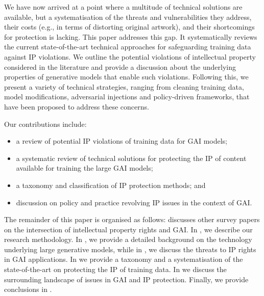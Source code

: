 \documentclass[conference,table]{IEEEtran}
\begin{document}
We have now arrived at a point where a multitude of technical solutions are available, but a systematisation of the threats and vulnerabilities they address, their costs (e.g., in terms of distorting original artwork), and their shortcomings for protection is lacking.
This paper addresses this gap. It systematically reviews the current state-of-the-art technical approaches for safeguarding training data against IP violations. 
We outline the potential violations of intellectual property considered in the literature and provide a discussion about the underlying properties of generative models that enable such violations. 
Following this, we present a variety of technical strategies, ranging from cleaning training data, model modifications, adversarial injections and policy-driven frameworks, that have been proposed to address these concerns. 

Our contributions include:
\begin{itemize}
    \item a review of potential IP violations of training data for GAI models;
    \item a systematic review of technical solutions for protecting the IP of content available for training the large GAI models; 
    \item a taxonomy and classification of IP protection methods; and
    \item discussion on policy and practice revolving IP issues in the context of GAI.
\end{itemize}

The remainder of this paper is organised as follows:  discusses other survey papers on the intersection of intellectual property rights and GAI. In , we describe our research methodology. In , we provide a detailed background on the technology underlying large generative models, while in , we discuss the threats to IP rights in GAI applications. In  we provide a taxonomy and a systematisation of the state-of-the-art on protecting the IP of training data. 
In  we discuss the surrounding landscape of issues in GAI and IP protection. Finally, we provide conclusions in .
\end{document}
